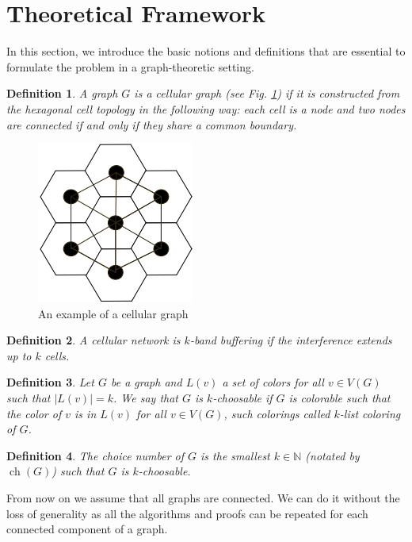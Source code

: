 \documentclass[letterpaper, 10 pt, conference]{ieeeconf}  %
\newtheorem{defi}{Definition}
\DeclareMathOperator*{\ch}{ch}
\begin{document}
\section{Theoretical Framework}\label{sec:theoretical-framework}
In this section, we introduce the basic notions and definitions that are essential to formulate the problem in a graph-theoretic setting.
\begin{defi} A graph $G$ is a  \textit{cellular graph} (see Fig. \ref{fig:cellular-graph}) if it is constructed from the hexagonal cell topology in the following way: each cell is a node and two nodes are connected if and only if they share a common boundary.
\end{defi}
\begin{figure}[!h]
\centering
\includegraphics[scale=0.4]{cellular_graph.png}
\caption{An example of a cellular graph}\label{fig:cellular-graph}
\end{figure}
\begin{defi} A cellular network is $k$\textit{-band buffering} if the interference extends up to $k$ cells.
\end{defi}
\begin{defi} Let $G$ be a graph and $L(v)$ a set of colors for all $v \in V(G)$ such that $|L(v)|=k$. We say that $G$ is $k$\textit{-choosable} if $G$ is colorable such that the color of $v$ is in $L(v)$ for all $v \in V(G)$, such colorings called $k$\textit{-list coloring} of $G$.
\end{defi}
\begin{defi} The \textit{choice number} of $G$ is the smallest $k \in \mathbb{N}$ (notated by $\ch(G)$) such that $G$ is $k$-choosable.
\end{defi}

From now on we assume that all graphs are connected. We can do it without the loss of generality as all the algorithms and proofs can be repeated for each connected component of a graph.
\end{document}
